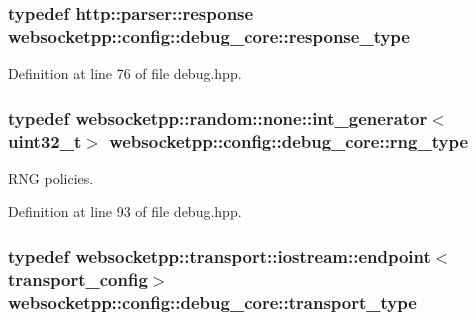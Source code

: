 \hypertarget{structwebsocketpp_1_1config_1_1debug__core_aa11255cb23f43afb8884bc464aa5c572}{}
\subsubsection[{response\+\_\+type}]{\setlength{\rightskip}{0pt plus 5cm}typedef {\bf http\+::parser\+::response} {\bf websocketpp\+::config\+::debug\+\_\+core\+::response\+\_\+type}}\label{structwebsocketpp_1_1config_1_1debug__core_aa11255cb23f43afb8884bc464aa5c572}


Definition at line 76 of file debug.\+hpp.

\hypertarget{structwebsocketpp_1_1config_1_1debug__core_ae59c72992beaef76957c8bfe407394e8}{}
\subsubsection[{rng\+\_\+type}]{\setlength{\rightskip}{0pt plus 5cm}typedef {\bf websocketpp\+::random\+::none\+::int\+\_\+generator}$<$uint32\+\_\+t$>$ {\bf websocketpp\+::config\+::debug\+\_\+core\+::rng\+\_\+type}}\label{structwebsocketpp_1_1config_1_1debug__core_ae59c72992beaef76957c8bfe407394e8}


R\+N\+G policies. 



Definition at line 93 of file debug.\+hpp.

\hypertarget{structwebsocketpp_1_1config_1_1debug__core_ac4daf5769128b2154a4b1f66e60e0e43}{}
\subsubsection[{transport\+\_\+type}]{\setlength{\rightskip}{0pt plus 5cm}typedef {\bf websocketpp\+::transport\+::iostream\+::endpoint}$<${\bf transport\+\_\+config}$>$ {\bf websocketpp\+::config\+::debug\+\_\+core\+::transport\+\_\+type}}\label{structwebsocketpp_1_1config_1_1debug__core_ac4daf5769128b2154a4b1f66e60e0e43}


